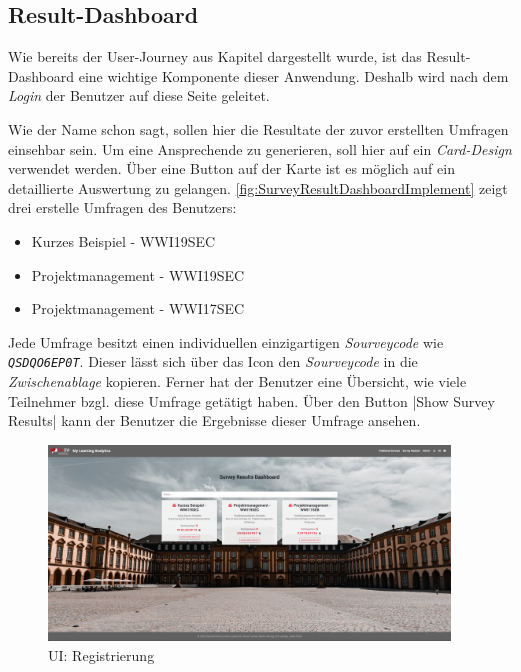 
\subsection{Result-Dashboard}
\label{ssec:ResultDashboardImplement}

Wie bereits der User-Journey aus Kapitel  dargestellt wurde, ist das Result-Dashboard eine wichtige Komponente dieser Anwendung. 
Deshalb wird nach dem \emph{Login} der Benutzer auf diese Seite geleitet. 

Wie der Name schon sagt, sollen hier die Resultate der zuvor erstellten Umfragen einsehbar sein. 
Um eine Ansprechende  zu generieren, soll hier auf ein \emph{Card-Design} verwendet werden. 
Über eine Button auf der Karte ist es möglich auf ein detaillierte Auswertung zu gelangen. \newline
\abb \vref{fig:SurveyResultDashboardImplement} zeigt drei erstelle Umfragen des Benutzers: 
% 
\begin{itemize}
	\item Kurzes Beispiel - WWI19SEC
	\item Projektmanagement - WWI19SEC
	\item Projektmanagement - WWI17SEC
\end{itemize}
% 
Jede Umfrage besitzt einen individuellen einzigartigen \emph{Sourveycode} wie \zb \emph{\texttt{QSDQO6EP0T}}. 
Dieser lässt sich über das Icon \faClipboard\xspace den \emph{Sourveycode} in die \emph{Zwischenablage} kopieren. 
Ferner hat der Benutzer eine Übersicht, wie viele Teilnehmer  bzgl. diese Umfrage getätigt haben. 
Über den Button \jinline|Show Survey Results| kann der Benutzer die Ergebnisse dieser Umfrage ansehen. 

\begin{figure}[!htb]
	\centering
	\includegraphics[width=0.95\textwidth, keepaspectratio]{img/client/SurveyResultDashboard.png}
	\captionsetup{justification=centering, format=plain}
	\caption[\acf{UI}: Registrierung]{\acf{UI}: Registrierung \\ \quelleScreenshot}
	\label{fig:SurveyResultDashboardImplement}
\end{figure}

